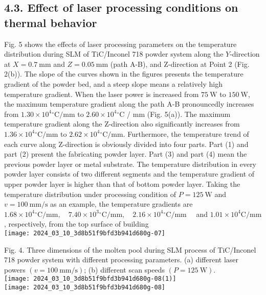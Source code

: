 \documentclass[10pt]{article}
\begin{document}
\subsection*{4.3. Effect of laser processing conditions on thermal behavior}
Fig. 5 shows the effects of laser processing parameters on the temperature distribution during SLM of TiC/Inconel 718 powder system along the $Y$-direction at $X=0.7 \mathrm{~mm}$ and $Z=0.05 \mathrm{~mm}$ (path A-B), and Z-direction at Point 2 (Fig. 2(b)). The slope of the curves shown in the figures presents the temperature gradient of the powder bed, and a steep slope means a relatively high temperature gradient. When the laser power is increased from $75 \mathrm{~W}$ to $150 \mathrm{~W}$, the maximum temperature gradient along the path A-B pronouncedly increases from $1.30 \times 10^{4}{ }^{\circ} \mathrm{C} / \mathrm{mm}$ to $2.60 \times 10^{4}{ }^{\circ} \mathrm{C}$ / $\mathrm{mm}$ (Fig. 5(a)). The maximum temperature gradient along the Z-direction also significantly increases from $1.36 \times 10^{4}{ }^{\circ} \mathrm{C} / \mathrm{mm}$ to $2.62 \times 10^{4}{ }^{\circ} \mathrm{C} / \mathrm{mm}$. Furthermore, the temperature trend of each curve along Z-direction is obviously divided into four parts. Part (1) and part (2) present the fabricating powder layer. Part (3) and part (4) mean the previous powder layer or metal substrate. The temperature distribution in every powder layer consists of two different segments and the temperature gradient of upper powder layer is higher than that of bottom powder layer. Taking the temperature distribution under processing condition of $P=125 \mathrm{~W}$ and $v=100 \mathrm{~mm} / \mathrm{s}$ as an example, the temperature gradients are $1.68 \times 10^{4}{ }^{\circ} \mathrm{C} / \mathrm{mm}, \quad 7.40 \times 10^{3}{ }^{\circ} \mathrm{C} / \mathrm{mm}, \quad 2.16 \times 10^{4}{ }^{\circ} \mathrm{C} / \mathrm{mm} \quad$ and $1.01 \times 10^{4} \mathrm{C} / \mathrm{mm}$, respectively, from the top surface of building\\
\texttt{[image: 2024\_03\_10\_3d8b51f9bfd3b941d680g-07]}

Fig. 4. Three dimensions of the molten pool during SLM process of TiC/Inconel 718 powder system with different processing parameters. (a) different laser powers $(v=100 \mathrm{~mm} / \mathrm{s})$; (b) different scan speeds $(P=125 \mathrm{~W})$.\\
\texttt{[image: 2024\_03\_10\_3d8b51f9bfd3b941d680g-08(1)]}\\
\texttt{[image: 2024\_03\_10\_3d8b51f9bfd3b941d680g-08]}
\end{document}
